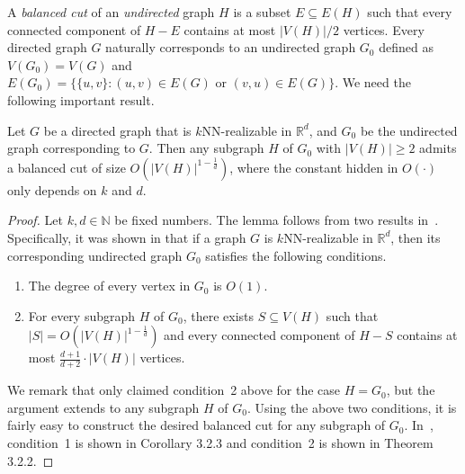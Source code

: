 A \textit{balanced cut} of an \textit{undirected} graph $H$ is a subset $E \subseteq E(H)$ such that every connected component of $H- E$ contains at most $|V(H)|/2$ vertices.
Every directed graph $G$ naturally corresponds to an undirected graph $G_0$ defined as $V(G_0) = V(G)$ and $E(G_0) = \{\{u,v\}: (u,v) \in E(G) \text{ or } (v,u) \in E(G)\}$.
We need the following important result.
\begin{lemma} \label{lem-smallcut}
Let $G$ be a directed graph that is $k$NN-realizable in $\mathbb{R}^d$, and $G_0$ be the undirected graph corresponding to $G$.
Then any subgraph $H$ of $G_0$ with $|V(H)| \geq 2$ admits a balanced cut of size $O(|V(H)|^{1-\frac{1}{d}})$, where the constant hidden in $O(\cdot)$ only depends on $k$ and $d$.
\end{lemma}
\begin{proof}
Let $k,d \in \mathbb{N}$ be fixed numbers.
The lemma follows from two results in~\cite{miller:1997}.
Specifically, it was shown in \cite{miller:1997} that if a graph $G$ is $k$NN-realizable in $\mathbb{R}^d$, then its corresponding undirected graph $G_0$ satisfies the following conditions.
\begin{enumerate}
    \item The degree of every vertex in $G_0$ is $O(1)$.
    \item For every subgraph $H$ of $G_0$, there exists $S \subseteq V(H)$ such that $|S| = O(|V(H)|^{1-\frac{1}{d}})$ and every connected component of $H - S$ contains at most $\frac{d+1}{d+2} \cdot |V(H)|$ vertices.
\end{enumerate}
We remark that \cite{miller:1997} only claimed condition~2 above for the case $H = G_0$, but the argument extends to any subgraph $H$ of $G_0$.
Using the above two conditions, it is fairly easy to construct the desired balanced cut for any subgraph of $G_0$.
In~\cite{miller:1997}, condition~1 is shown in Corollary 3.2.3 and condition~2 is shown in Theorem 3.2.2.


\end{proof}
